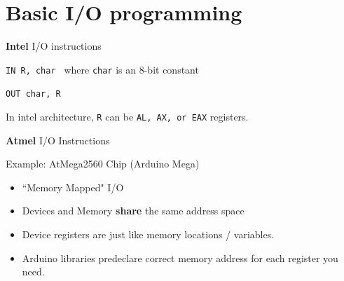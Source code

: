 \documentclass{article}	%
\begin{document}
\section{Basic I/O programming}

{\bf Intel} I/O instructions

{\tt IN         R, char }
where {\tt char} is an 8-bit constant

{\tt OUT        char, R }

In intel architecture, {\tt R} can be {\tt AL, AX, or EAX} registers.




{\bf Atmel} I/O Instructions 

Example:   AtMega2560 Chip (Arduino Mega)

\begin{itemize}

    \item ``Memory Mapped" I/O
    \item Devices and Memory {\bf share } the same address space
    \item Device registers are just like memory locations / variables. 
    \item Arduino libraries predeclare correct memory address for each register you need. 
\end{itemize}
\end{document}
